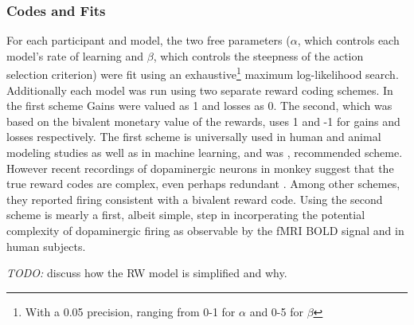 \documentclass[doc,12pt]{apa}        %
\begin{document}
\subsubsection{Codes and Fits}
\label{subsub:codesandfits}
For each participant and model, the two free parameters ($\alpha$, which controls each model's rate of learning and $\beta$, which controls the steepness of the action selection criterion) were fit using an exhaustive\footnote{With a 0.05 precision, ranging from 0-1 for $\alpha$ and 0-5 for $\beta$} maximum log-likelihood search.  Additionally each model was run using two separate reward coding schemes.  In the first scheme Gains were valued as 1 and losses as 0.  The second, which was based on the bivalent monetary value of the rewards, uses 1 and -1 for gains and losses respectively.  The first scheme is universally used in human and animal modeling studies as well as in machine learning, and was , recommended scheme.  However recent recordings of dopaminergic neurons in monkey suggest that the true reward codes are complex, even perhaps redundant  .  Among other schemes, they reported firing consistent with a bivalent reward code.  Using the second scheme is mearly a first, albeit simple, step in incorperating the potential complexity of dopaminergic firing as observable by the fMRI BOLD signal and in human subjects.

\emph{TODO:} discuss how the RW model is simplified and why.
\end{document}
